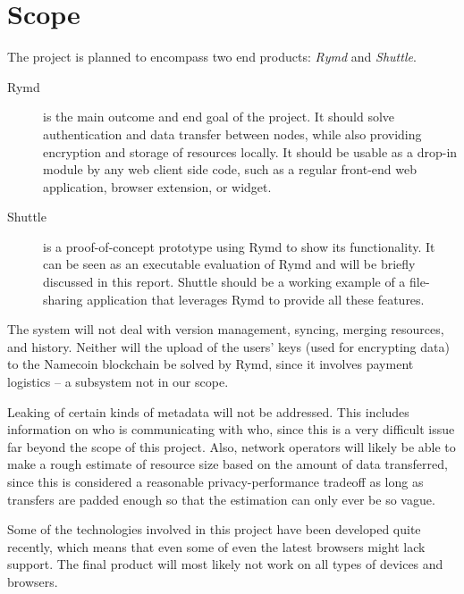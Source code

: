 \section{Scope}

The project is planned to encompass two end products: \emph{Rymd} and \emph{Shuttle}.

\begin{description}
\item[Rymd] is the main outcome and end goal of the project. It should solve authentication and data transfer between nodes, while also providing encryption and storage of resources locally. It should be usable as a drop-in module by any web client side code, such as a regular front-end web application, browser extension, or widget.

\item[Shuttle] is a proof-of-concept prototype using Rymd to show its functionality. It can be seen as an executable evaluation of Rymd and will be briefly discussed in this report. Shuttle should be a working example of a file-sharing application that leverages Rymd to provide all these features.
\end{description}

The system will not deal with version management, syncing, merging resources, and history. Neither will the upload of the users’ keys (used for encrypting data) to the Namecoin blockchain be solved by Rymd, since it involves payment logistics – a subsystem not in our scope.

Leaking of certain kinds of metadata will not be addressed. This includes information on who is communicating with who, since this is a very difficult issue far beyond the scope of this project. Also, network operators will likely be able to make a rough estimate of resource size based on the amount of data transferred, since this is considered a reasonable privacy-performance tradeoff as long as transfers are padded enough so that the estimation can only ever be so vague.

Some of the technologies involved in this project have been developed quite recently, which means that even some of even the latest browsers might lack support. The final product will most likely not work on all types of devices and browsers.
